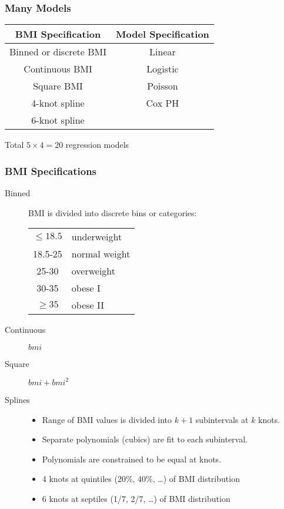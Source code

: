 \documentclass{philslides}
\begin{document}
\frame
{
	\frametitle{Many Models}
	\begin{center}
	\begin{tabular}{c|c}
	\textbf{BMI Specification} & \textbf{Model Specification}\\
	\hline
	Binned or discrete BMI & Linear \\
	Continuous BMI & Logistic\\
	Square BMI & Poisson\\
	4-knot spline & Cox PH\\
	6-knot spline &\\
	\end{tabular}
	\end{center}
	Total $5 \times 4 = 20$ regression models
}
\frame
{
	\frametitle{BMI Specifications}
	\begin{description}
	\item[Binned] BMI is divided into discrete bins or categories:  
		\begin{center}
		\small
		\begin{tabular}{cl}
		$\leq 18.5$ & underweight\\
		18.5-25 & normal weight\\
		25-30 & overweight\\
		30-35 & obese I\\
		$\geq 35$ & obese II
		\end{tabular}
		\end{center}
	\item[Continuous] $bmi$
	\item[Square] $bmi + bmi^2$
	\item[Splines] 
		\begin{itemize}
		\scriptsize
		\item Range of BMI values is divided into $k+1$ subintervals at $k$ knots.  
		\item Separate polynomials (cubics) are fit to each subinterval.  
		\item Polynomials are constrained to be equal at knots.  
		\item 4 knots at quintiles (20\%, 40\%, \ldots) of BMI distribution
		\item 6 knots at septiles (1/7, 2/7, \ldots) of BMI distribution
		\end{itemize}
	\end{description}
}
\frame
\end{document}
